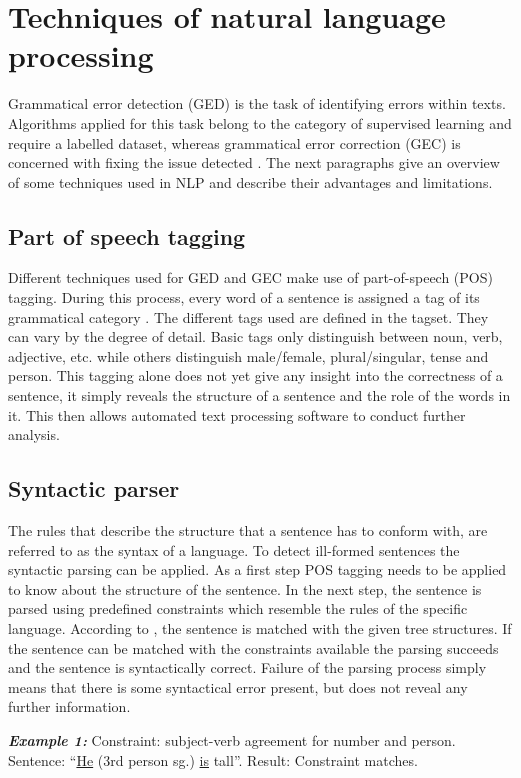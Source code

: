 \documentclass[runningheads]{llncs}
\begin{document}
\section{Techniques of natural language processing}
Grammatical error detection (GED) is the task of identifying errors within texts. Algorithms applied for this task belong to the category of supervised learning and require a labelled dataset, whereas grammatical error correction (GEC) is concerned with fixing the issue detected \citep{bell_context_2019}. The next paragraphs give an overview of some techniques used in NLP and describe their advantages and limitations.

\subsection{Part of speech tagging}
Different techniques used for GED and GEC make use of part-of-speech (POS) tagging. During this process, every word of a sentence is assigned a tag of its grammatical category \citep{noauthor_sketch_2018}. The different tags used are defined in the tagset. They can vary by the degree of detail. Basic tags only distinguish between noun, verb, adjective, etc. while others distinguish male/female, plural/singular, tense and person. This tagging alone does not yet give any insight into the correctness of a sentence, it simply reveals the structure of a sentence and the role of the words in it. This then allows automated text processing software to conduct further analysis.

\subsection{Syntactic parser}   
The rules that describe the structure that a sentence has to conform with, are referred to as the syntax of a language. To detect ill-formed sentences the syntactic parsing can be applied. As a first step POS tagging needs to be applied to know about the structure of the sentence. In the next step, the sentence is parsed using predefined constraints which resemble the rules of the specific language. According to \textcite{manchanda_various_2016}, the sentence is matched with the given tree structures. If the sentence can be matched with the constraints available the parsing succeeds and the sentence is syntactically correct. Failure of the parsing process simply means that there is some syntactical error present, but does not reveal any further information.

\textbf{\textit{Example 1:}} Constraint: subject-verb agreement for number and person. Sentence: ``\underline{He} (3rd person sg.) \underline{is} tall''. Result: Constraint matches.
\end{document}
